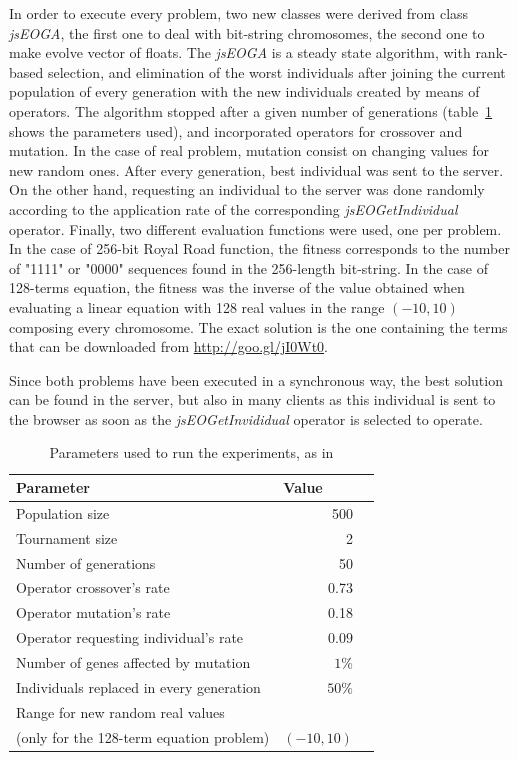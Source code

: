 \documentclass[runningheads,a4paper]{llncs}
\begin{document}
In order to execute every problem, two new classes were derived from class \textit{jsEOGA}, the first one to deal with bit-string chromosomes, the second one to make evolve vector of floats. The \textit{jsEOGA} is a steady state algorithm, with rank-based selection, and elimination of the worst individuals after joining the current population of every generation with the new individuals created by means of operators. The algorithm stopped after a given number of generations (table~\ref{tb:params} shows the parameters used), and incorporated operators for crossover and mutation. In the case of real problem, mutation consist on changing values for new random ones. After every generation, best individual was sent to the server. On the other hand, requesting an individual to the server was done randomly according to the application rate of the corresponding \textit{jsEOGetIndividual} operator. Finally, two different evaluation functions were used, one per problem. In the case of 256-bit Royal Road function, the fitness corresponds to the number of "1111" or "0000" sequences found in the 256-length bit-string. In the case of 128-terms equation, the fitness was the inverse of the value obtained when evaluating a linear equation with 128 real values in the range $(-10,10)$ composing every chromosome. The exact solution is the one containing the terms that can be downloaded from \url{http://goo.gl/jI0Wt0}.
	
Since both problems have been executed in a synchronous way, the best solution can be found in the server, but also in many clients as this individual is sent to the browser as soon as the \textit{jsEOGetInvididual} operator is selected to operate.



\begin{table}
\caption{Parameters used to run the experiments, as in{\cite{agajaj}}}
\begin{center}
\begin{tabular}{l@{\quad}rl}
\hline
\multicolumn{1}{l}{\rule{0pt}{12pt}
                   Parameter}&\multicolumn{2}{l}{Value}\\[2pt]
\hline\rule{0pt}{12pt}
Population size & 500 & \\
Tournament size & 2 & \\
Number of generations  & 50 & \\
Operator crossover's rate & 0.73 & \\
Operator mutation's rate & 0.18 & \\
Operator requesting individual's rate & $0.09$ & \\
Number of genes affected by mutation & $1\%$ &\\
Individuals replaced in every generation & $50\%$ & \\
Range for new random real values && \\
(only for the 128-term equation problem) & $(-10,10)$ & \\[2pt]
\hline

\end{tabular}
\label{tb:params}
\end{center}
\end{table}
\end{document}

